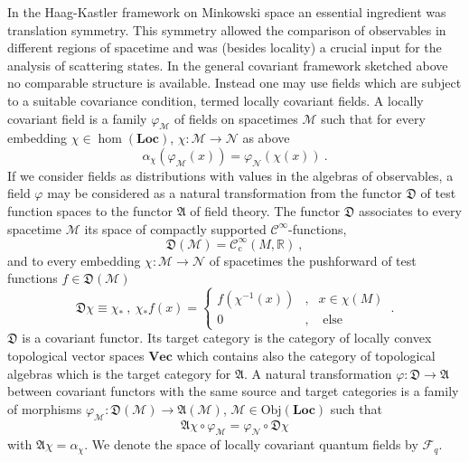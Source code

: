 \documentclass[12pt]{article}
\newcommand{\Fcal}{\mathcal{F}}
\newcommand{\Ncal}{\mathcal{N}}
\newcommand{\Mcal}{\mathcal{M}}
\newcommand{\Loc}{\mathrm{\mathbf{Loc}}}       %
\newcommand{\Vect}{\mathrm{\mathbf{Vec}}}       %
\newcommand{\RR}{\mathbb{R}}           %
\newcommand{\ph}{\varphi}
\newcommand{\1}{\mathds{1}}                         %
\newcommand{\be}{\begin{equation}}
\newcommand{\ee}{\end{equation}}
\begin{document}
In the Haag-Kastler framework on Minkowski space an essential ingredient was translation symmetry. This symmetry allowed the comparison of observables in different regions of spacetime and was  (besides locality) a crucial input for the analysis of scattering states. In the general covariant framework sketched above no comparable structure is available. Instead one may use fields which are subject to a suitable covariance condition, termed locally covariant fields. A locally covariant field is a family $\ph_\Mcal$ of fields on spacetimes $\Mcal$ such that for every embedding $\chi\in\hom(\Loc)$, $\chi:\Mcal\to \Ncal$ as above
\be
\alpha_{\chi}(\ph_\Mcal(x))=\ph_\Ncal(\chi(x)) \ .
\ee
If we consider fields as distributions with values in the algebras of observables, a field $\ph$ may be considered as a natural transformation from the functor $\mathfrak{D}$ of test function spaces to the functor $\mathfrak{A}$ of field theory.
The functor $\mathfrak{D}$ associates to every spacetime $\Mcal$ its space of compactly supported $\mathcal{C}^{\infty}$-functions,
\be
\mathfrak{D}(\Mcal)=\mathcal{C}^{\infty}_{\mathrm{c}}(M,\RR)\ ,
\ee
and to every embedding $\chi:\Mcal\to \Ncal$ of spacetimes the pushforward of test functions $f\in\mathfrak{D}(\Mcal)$
\be
\mathfrak{D}\chi\equiv \chi_*\ ,\ \chi_*f(x)=\left\{ \begin{array}{ccc}
                                                                                    f(\chi^{-1}(x)) &,&x\in\chi(M)\\
                                                                                    0                    &,&\text{ else}
                                                                                    \end{array}
                                                                           \right.\,.
\ee
$\mathfrak{D}$ is a covariant functor. Its target category is the category of locally convex topological vector spaces $\Vect$ which contains also the category of topological algebras which is the target category for $\mathfrak{A}$. A natural transformation $\ph:\mathfrak{D}\to\mathfrak{A}$ between covariant functors with the same source and target categories is a family of morphisms $\ph_{\Mcal}:\mathfrak{D}(\Mcal)\to\mathfrak{A}(\Mcal)$, $\Mcal\in \mathrm{Obj}(\Loc)$ such that
\be
\mathfrak{A}\chi\circ\ph_{\Mcal}=\ph_{\Ncal}\circ\mathfrak{D}\chi
\ee
with $\mathfrak{A}\chi=\alpha_{\chi}$. We denote the space of locally covariant quantum fields by $\Fcal_q$.
\end{document}
